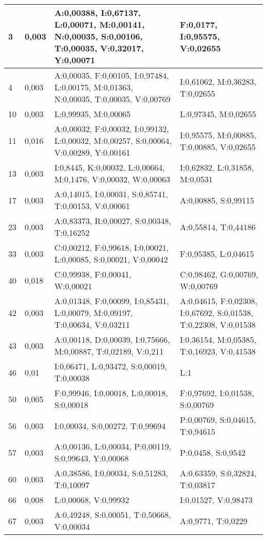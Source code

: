 \begin{landscape}
\begin{longtable}{|l|l|p{10.5cm}|p{10.5cm}|}
	3 & 0,003 & A:0,00388, I:0,67137, L:0,00071, M:0,00141, N:0,00035, S:0,00106, T:0,00035, V:0,32017, Y:0,00071 & F:0,0177, I:0,95575, V:0,02655 \\ \hline 
	4 & 0,003 & A:0,00035, F:0,00105, I:0,97484, L:0,00175, M:0,01363, N:0,00035, T:0,00035, V:0,00769 & I:0,61062, M:0,36283, T:0,02655 \\ \hline 
	10 & 0,003 & L:0,99935, M:0,00065 & L:0,97345, M:0,02655 \\ \hline 
	11 & 0,016 & A:0,00032, F:0,00032, I:0,99132, L:0,00032, M:0,00257, S:0,00064, V:0,00289, Y:0,00161 & I:0,95575, M:0,00885, T:0,00885, V:0,02655 \\ \hline 
	13 & 0,003 & I:0,8445, K:0,00032, L:0,00664, M:0,1476, V:0,00032, W:0,00063 & I:0,62832, L:0,31858, M:0,0531 \\ \hline 
	17 & 0,003 & A:0,14015, I:0,00031, S:0,85741, T:0,00153, V:0,00061 & A:0,00885, S:0,99115 \\ \hline 
	23 & 0,003 & A:0,83373, R:0,00027, S:0,00348, T:0,16252 & A:0,55814, T:0,44186 \\ \hline 
	33 & 0,003 & C:0,00212, F:0,99618, I:0,00021, L:0,00085, S:0,00021, V:0,00042 & F:0,95385, L:0,04615 \\ \hline 
	40 & 0,018 & C:0,99938, F:0,00041, W:0,00021 & C:0,98462, G:0,00769, W:0,00769 \\ \hline 
	42 & 0,003 & A:0,01348, F:0,00099, I:0,85431, L:0,00079, M:0,09197, T:0,00634, V:0,03211 & A:0,04615, F:0,02308, I:0,67692, S:0,01538, T:0,22308, V:0,01538 \\ \hline 
	43 & 0,003 & A:0,00118, D:0,00039, I:0,75666, M:0,00887, T:0,02189, V:0,211 & I:0,36154, M:0,05385, T:0,16923, V:0,41538 \\ \hline 
	46 & 0,01 & I:0,06471, L:0,93472, S:0,00019, T:0,00038 & L:1 \\ \hline 
	50 & 0,005 & F:0,99946, I:0,00018, L:0,00018, S:0,00018 & F:0,97692, I:0,01538, S:0,00769 \\ \hline 
	56 & 0,003 & I:0,00034, S:0,00272, T:0,99694 & P:0,00769, S:0,04615, T:0,94615 \\ \hline 
	57 & 0,003 & A:0,00136, L:0,00034, P:0,00119, S:0,99643, Y:0,00068 & P:0,0458, S:0,9542 \\ \hline 
	60 & 0,003 & A:0,38586, I:0,00034, S:0,51283, T:0,10097 & A:0,63359, S:0,32824, T:0,03817 \\ \hline 
	66 & 0,008 & L:0,00068, V:0,99932 & I:0,01527, V:0,98473 \\ \hline 
	67 & 0,003 & A:0,49248, S:0,00051, T:0,50668, V:0,00034 & A:0,9771, T:0,0229 \\ \hline 

\end{longtable}
\end{landscape}
